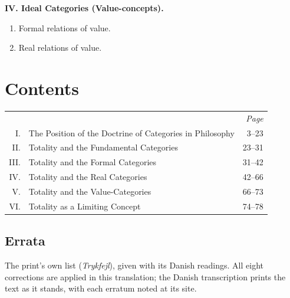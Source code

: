 \documentclass[12pt]{book}
\newcommand{\opage}[1]{\marginnote{\footnotesize\textit{[#1]}}}
\begin{document}
\medskip

\noindent\textbf{IV. Ideal Categories (Value-concepts).}
\begin{enumerate}[leftmargin=2.5em,itemsep=0pt,parsep=0pt,topsep=2pt]
\item Formal relations of value.
\item Real relations of value.
\end{enumerate}
\endgroup

\chapter*{Contents}
\opage{80}%
\begin{center}
\begin{tabular}{@{}r@{\quad}l@{\qquad}r@{}}
 & & \textit{Page}\\[2pt]
I. & The Position of the Doctrine of Categories in Philosophy & 3--23\\
II. & Totality and the Fundamental Categories & 23--31\\
III. & Totality and the Formal Categories & 31--42\\
IV. & Totality and the Real Categories & 42--66\\
V. & Totality and the Value-Categories & 66--73\\
VI. & Totality as a Limiting Concept & 74--78\\
\end{tabular}
\end{center}

\section*{Errata}
\noindent The print's own list (\textit{Trykfejl}), given with its Danish
readings. All eight corrections are applied in this translation; the Danish
transcription prints the text as it stands, with each erratum noted at its site.
\end{document}
